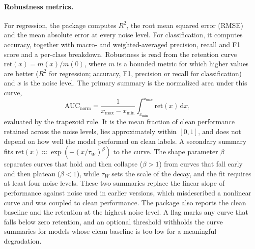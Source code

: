 \paragraph{Robustness metrics.} For regression, the package computes $R^2$, the root mean squared error (RMSE) and the mean absolute
error at every noise level. For classification, it computes accuracy, together with macro- and weighted-averaged precision, recall and F1
score and a per-class breakdown. Robustness is read from the
retention curve $\mathrm{ret}(x) = m(x)/m(0)$, where $m$ is a bounded metric for which higher values are better
($R^2$ for regression; accuracy, F1, precision or recall for classification) and $x$ is the noise
level. The primary summary is the normalized area under this curve,
\begin{equation}
\mathrm{AUC}_{\mathrm{norm}} = \frac{1}{x_{\max} - x_{\min}} \int_{x_{\min}}^{x_{\max}} \mathrm{ret}(x)\,\mathrm{d}x,
\label{eq:auc_norm}
\end{equation}
evaluated by the trapezoid rule. It is the mean fraction of clean performance retained across the
noise levels, lies approximately within $[0, 1]$, and does not depend on how well the model performed on clean labels. A
secondary summary fits $\mathrm{ret}(x) \approx \exp\!\left(-(x/\tau_W)^{\beta}\right)$ to the curve. The shape parameter
$\beta$ separates curves that hold and then collapse ($\beta > 1$) from curves that fall early and
then plateau ($\beta < 1$), while $\tau_W$ sets the scale of the decay, and the fit requires at least four
noise levels. These two summaries replace the linear slope of performance against noise used in
earlier versions, which misdescribed a nonlinear curve and was coupled to clean performance. The
package also reports the clean baseline and the retention at the highest noise level. A flag marks any
curve that falls below zero retention, and an optional threshold withholds the curve summaries for
models whose clean baseline is too low for a meaningful degradation.

